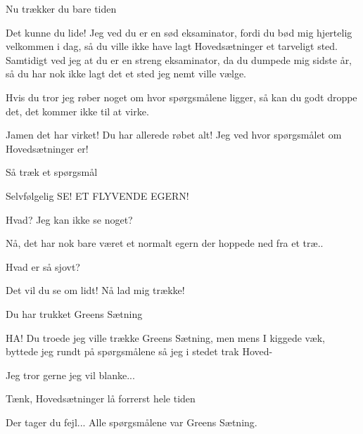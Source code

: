\documentclass[a4paper,11pt]{article}
\begin{document}
\begin{sketch}
 Nu trækker du bare tiden

 Det kunne du lide! Jeg ved du er en sød eksaminator, fordi du bød mig hjertelig velkommen i dag, så du ville ikke have lagt Hovedsætninger et tarveligt sted. Samtidigt ved jeg at du er en streng eksaminator, da du dumpede mig sidste år, så du har nok ikke lagt det et sted jeg nemt ville vælge.

 Hvis du tror jeg røber noget om hvor spørgsmålene ligger, så kan du godt droppe det, det kommer ikke til at virke.

 Jamen det har virket! Du har allerede røbet alt! Jeg ved hvor spørgsmålet om Hovedsætninger er!

 Så træk et spørgsmål

 Selvfølgelig  SE! ET FLYVENDE EGERN!


 Hvad? Jeg kan ikke se noget?

  Nå, det har nok bare været et normalt egern der hoppede ned fra et træ..

 Hvad er så sjovt?

 Det vil du se om lidt! Nå lad mig trække! 

 Du har trukket Greens Sætning

 HA! Du troede jeg ville trække Greens Sætning, men mens I kiggede væk, byttede jeg rundt på spørgsmålene så jeg i stedet trak Hoved- 

  Jeg tror gerne jeg vil blanke...


 Tænk, Hovedsætninger lå forrerst hele tiden

 Der tager du fejl...  Alle spørgsmålene var Greens Sætning.

\end{sketch}
\end{document}
